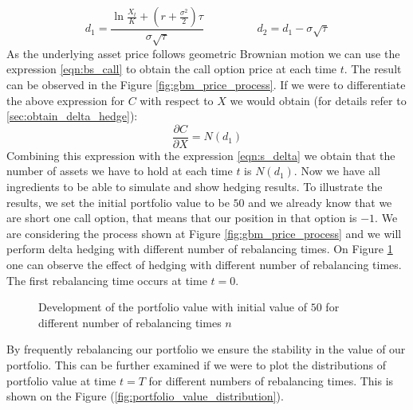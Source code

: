 \documentclass[times, utf8, diplomski]{fer}
\begin{document}
\begin{equation} \label{eqn:d1d2}
	d_1 = \frac{\ln{\frac{X_t}{K}} + \left(r + \frac{\sigma^2}{2} \right)\tau}{\sigma\sqrt{\tau}} \hspace{2cm} d_2 = d_1 - \sigma\sqrt{\tau}
\end{equation}
As the underlying asset price follows geometric Brownian motion we can use the expression \ref{eqn:bs_call} to obtain the call option price at each time $t$. The result can be observed in the Figure \ref{fig:gbm_price_process}. If we were to differentiate the above expression for $C$ with respect to $X$ we would obtain (for details refer to \ref{sec:obtain_delta_hedge}): 
\begin{equation} \label{eqn:delta_nd1}
	\frac{\partial C}{\partial X} = N(d_1)
\end{equation}
Combining this expression with the expression \ref{eqn:s_delta} we obtain that the number of assets we have to hold at each time $t$ is $N(d_1)$. Now we have all ingredients to be able to simulate and show hedging results. To illustrate the results, we set the initial portfolio value to be $50$ and we already know that we are short one call option, that means that our position in that option is $-1$. We are considering the process shown at Figure \ref{fig:gbm_price_process} and we will perform delta hedging with different number of rebalancing times. On Figure \ref{fig:hedging_gbm} one can observe the effect of hedging with different number of rebalancing times. The first rebalancing time occurs at time $t=0$. 

\begin{figure}[ht]
\centering

\caption{Development of the portfolio value with initial value of $50$ for different number of rebalancing times $n$}
\label{fig:hedging_gbm}	
\end{figure}
\noindent By frequently rebalancing our portfolio we ensure the stability in the value of our portfolio. This can be further examined if we were to plot the distributions of portfolio value at time $t=T$ for different numbers of rebalancing times. This is shown on the Figure (\ref{fig:portfolio_value_distribution}).
\end{document}
